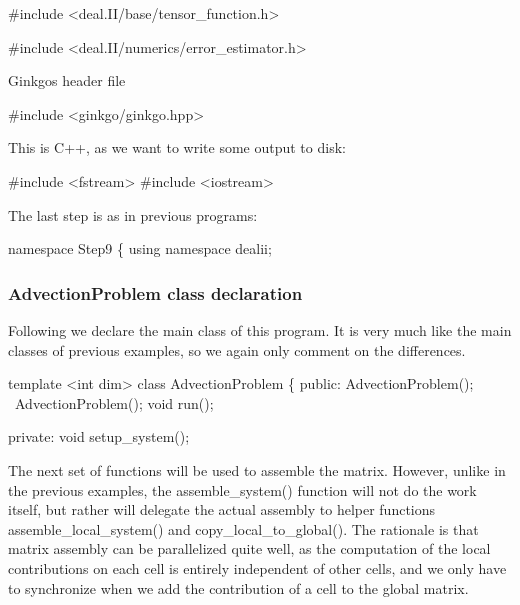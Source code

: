 \begin{DoxyCode}
\textcolor{preprocessor}{#include <deal.II/base/tensor\_function.h>}

\textcolor{preprocessor}{#include <deal.II/numerics/error\_estimator.h>}
\end{DoxyCode}


Ginkgo\textquotesingle{}s header file


\begin{DoxyCode}
\textcolor{preprocessor}{#include <ginkgo/ginkgo.hpp>}
\end{DoxyCode}


This is C++, as we want to write some output to disk\+:


\begin{DoxyCode}
\textcolor{preprocessor}{#include <fstream>}
\textcolor{preprocessor}{#include <iostream>}
\end{DoxyCode}


The last step is as in previous programs\+:


\begin{DoxyCode}
\textcolor{keyword}{namespace }Step9 \{
\textcolor{keyword}{using namespace }dealii;
\end{DoxyCode}


\label{_AdvectionProblemclassdeclaration}%
 \subsubsection*{Advection\+Problem class declaration}

Following we declare the main class of this program. It is very much like the main classes of previous examples, so we again only comment on the differences.


\begin{DoxyCode}
\textcolor{keyword}{template} <\textcolor{keywordtype}{int} dim>
\textcolor{keyword}{class }AdvectionProblem \{
\textcolor{keyword}{public}:
    AdvectionProblem();
    ~AdvectionProblem();
    \textcolor{keywordtype}{void} run();

\textcolor{keyword}{private}:
    \textcolor{keywordtype}{void} setup\_system();
\end{DoxyCode}


The next set of functions will be used to assemble the matrix. However, unlike in the previous examples, the {\ttfamily assemble\+\_\+system()} function will not do the work itself, but rather will delegate the actual assembly to helper functions {\ttfamily assemble\+\_\+local\+\_\+system()} and {\ttfamily copy\+\_\+local\+\_\+to\+\_\+global()}. The rationale is that matrix assembly can be parallelized quite well, as the computation of the local contributions on each cell is entirely independent of other cells, and we only have to synchronize when we add the contribution of a cell to the global matrix.

